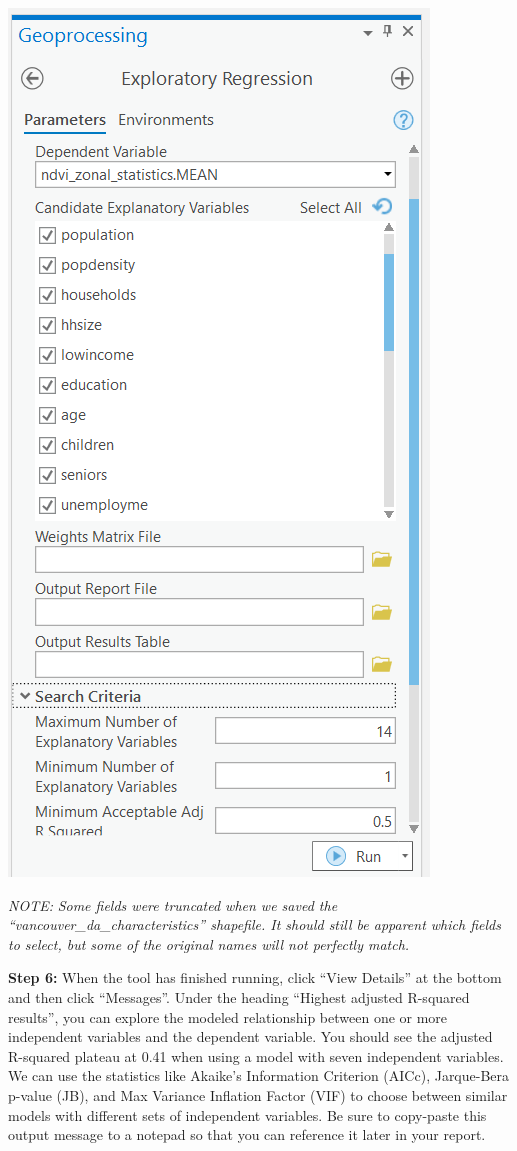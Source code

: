 \documentclass[
]{book}
\begin{document}
\includegraphics[width=0.75\linewidth]{images/05-arcgis-exploratory-regression}

\emph{NOTE:} \emph{Some fields were truncated when we saved the ``vancouver\_da\_characteristics'' shapefile. It should still be apparent which fields to select, but some of the original names will not perfectly match.}

\textbf{Step 6:} When the tool has finished running, click ``View Details'' at the bottom and then click ``Messages''. Under the heading ``Highest adjusted R-squared results'', you can explore the modeled relationship between one or more independent variables and the dependent variable. You should see the adjusted R-squared plateau at 0.41 when using a model with seven independent variables. We can use the statistics like Akaike's Information Criterion (AICc), Jarque-Bera p-value (JB), and Max Variance Inflation Factor (VIF) to choose between similar models with different sets of independent variables. Be sure to copy-paste this output message to a notepad so that you can reference it later in your report.
\end{document}
